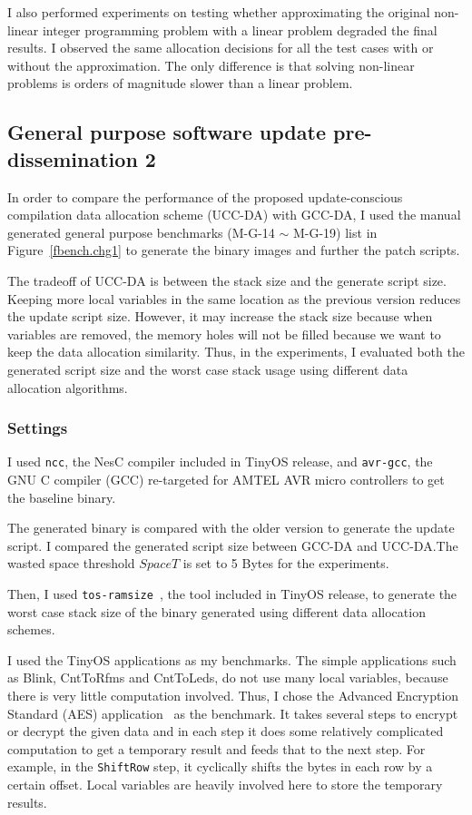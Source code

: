 I also performed experiments on testing whether approximating the
original non-linear integer programming problem with a linear problem
degraded the final results. I observed the same allocation decisions
for all the test cases with or without the approximation. The only
difference is that solving non-linear problems is orders of
magnitude slower than a linear problem.




\subsection{General purpose software update pre-dissemination 2}\label{exper-da}

In order to compare the performance of the proposed update-conscious compilation data
allocation scheme (UCC-DA) with GCC-DA, I used the manual generated general purpose 
benchmarks (M-G-14 $\sim$ M-G-19) list in
Figure~\ref{fbench.chg1} to generate the binary images and further the patch scripts.

The tradeoff of UCC-DA is between the stack size and the generate script size.
Keeping more local variables in the same location as the previous version reduces
the update script size. However, it may increase the stack size because when variables
are removed, the memory holes will not be filled because we want to 
keep the data allocation similarity. Thus, in the experiments, I evaluated both the
generated script size and the worst case stack usage using different data allocation
algorithms.

\subsubsection{Settings}

I used {\tt ncc}, the NesC compiler
included in TinyOS release, and {\tt avr-gcc}, the GNU C compiler
(GCC) re-targeted for AMTEL AVR micro controllers to get the baseline binary.

The generated binary is compared with the older version to generate
the update script. I compared the generated script size between GCC-DA
and UCC-DA.The wasted space threshold $SpaceT$ is set to 5 Bytes for the experiments.


Then, I used {\tt tos-ramsize}~\cite{ramsize}, the tool included in TinyOS release, to
generate the worst case stack size of the binary generated using
different data allocation schemes.

I used the TinyOS applications as my benchmarks. The simple applications
such as Blink, CntToRfms and CntToLeds, do not use many local variables,
because there is very little computation involved.
Thus, I chose the Advanced Encryption Standard (AES) application~\cite{aes} as the benchmark. 
It takes several steps to encrypt or decrypt the given data and in each step it does
some relatively complicated computation to get a temporary result and feeds that
to the next step. For example, in the  {\tt ShiftRow} step, it  
cyclically shifts the bytes in each row by a certain offset. 
Local variables are heavily involved here to store the temporary results.

